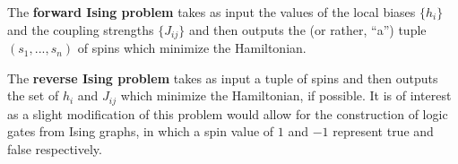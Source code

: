The \textbf{forward Ising problem} takes as input the values of the local biases $\{h_i\}$ and the coupling strengths $\{J_{ij}\}$ and then outputs the (or rather, ``a'') tuple $(s_1,...,s_n)$ of spins which minimize the Hamiltonian.

The \textbf{reverse Ising problem} takes as input a tuple of spins and then outputs the set of $h_{i}$ and $J_{ij}$ which minimize the Hamiltonian, if possible. It is of interest as a slight modification of this problem would allow for the construction of logic gates from Ising graphs, in which a spin value of $1$ and $-1$ represent true and false respectively.



\begin{example}\label{example:and-gate}
	
\end{example}


